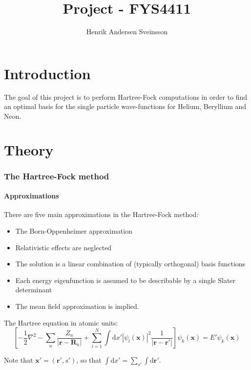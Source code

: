 \documentclass[a4paper,10pt, twocolumn]{article}
\title{Project - FYS4411}
\author{Henrik Andersen Sveinsson}
\newcommand{\rvec}{\mathbf{r}}
\newcommand{\Rvec}{\mathbf{R}}
\newcommand{\xvec}{\mathbf{x}}
\newcommand{\dd}{\mathrm{d}}
\begin{document}
\maketitle

\begin{abstract}

\end{abstract}

\part{Introduction}
The goal of this project is to perform Hartree-Fock computations in order to find an optimal basis for the single particle wave-functions for Helium, Beryllium and Neon.

\part{Theory}
\section{The Hartree-Fock method}

\subsection{Approximations}
There are five main approximations in the Hartree-Fock method:
\begin{itemize}
 \item The Born-Oppenheimer approximation
 \item Relativistic effects are neglected
 \item The solution is a linear combination of (typically orthogonal) basis functions
 \item Each energy eigenfunction is assumed to be describable by a single Slater determinant
 \item The mean field approximation is implied. 
\end{itemize}

The Hartree equation in atomic units:
\begin{equation}
 \left[ -\frac{1}{2}\nabla^2 -\sum_n \frac{Z_n}{|\rvec -\Rvec_n|} + 
 \sum_{l=1}^N \int \dd x' |\psi_l(\xvec)|^2 \frac{1}{|\rvec -\rvec'|}\right] \psi_k(\xvec) 
 = E' \psi_k (\xvec)
\end{equation}

Note that $\xvec' = (\rvec', s')$, so that $\int \dd x' = \sum_{s'} \int \dd \rvec'$.
\end{document}
